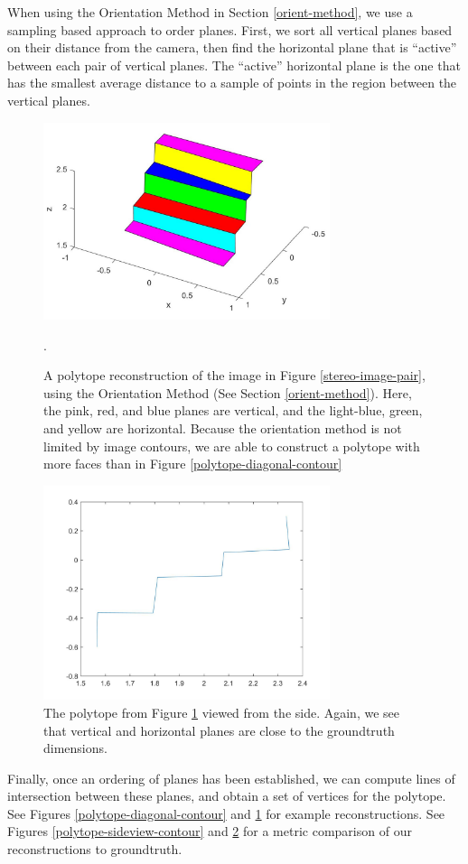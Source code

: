 When using the Orientation Method in Section \ref{orient-method}, we use a sampling based approach to order planes. First, we sort all vertical planes based on their distance from the camera, then find the horizontal plane that is ``active'' between each pair of vertical planes. The ``active'' horizontal plane is the one that has the smallest average distance to a sample of points in the region between the vertical planes.


\begin{figure}[!h]
\centering
\includegraphics[width=3.3in]{Sections/Figures/polytope_diagonal_geom.jpg}
\caption{A polytope reconstruction of the image in Figure \ref{stereo-image-pair}, using the Orientation Method (See Section \ref{orient-method}). Here, the pink, red, and blue planes are vertical, and the light-blue, green, and yellow are horizontal. Because the orientation method is not limited by image contours, we are able to construct a polytope with more faces than in Figure \ref{polytope-diagonal-contour}}.
\label{polytope-diagonal-orient}
\end{figure}

\begin{figure}[!h]
\centering
\includegraphics[width=3.3in]{Sections/Figures/geom_sideview_2d.jpg}
\caption{The polytope from Figure \ref{polytope-diagonal-orient} viewed from the side. Again, we see that vertical and horizontal planes are close to the groundtruth dimensions.}
\label{polytope-sideview-orient}
\end{figure}

Finally, once an ordering of planes has been established, we can compute lines of intersection between these planes, and obtain a set of vertices for the polytope. See Figures \ref{polytope-diagonal-contour} and \ref{polytope-diagonal-orient} for example reconstructions. See Figures \ref{polytope-sideview-contour} and \ref{polytope-sideview-orient} for a metric comparison of our reconstructions to groundtruth.

